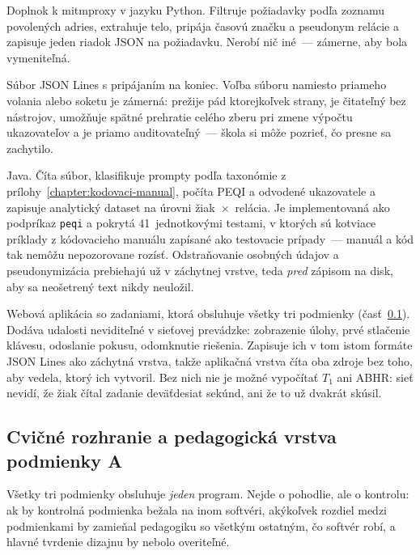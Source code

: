 \begin{description}[leftmargin=2.6cm, style=nextline, nosep]
    \item[Záchytná vrstva] Doplnok k mitmproxy v jazyku Python. Filtruje požiadavky podľa zoznamu povolených adries, extrahuje telo, pripája časovú značku a pseudonym relácie a zapisuje jeden riadok JSON na požiadavku. Nerobí nič iné~--- zámerne, aby bola vymeniteľná.
    \item[Prepojenie] Súbor JSON Lines s pripájaním na koniec. Voľba súboru namiesto priameho volania alebo soketu je zámerná: prežije pád ktorejkoľvek strany, je čitateľný bez nástrojov, umožňuje spätné prehratie celého zberu pri zmene výpočtu ukazovateľov a je priamo auditovateľný~--- škola si môže pozrieť, čo presne sa zachytilo.
    \item[Aplikačná vrstva] Java. Číta súbor, klasifikuje prompty podľa taxonómie z prílohy~\ref{chapter:kodovaci-manual}, počíta PEQI a odvodené ukazovatele a zapisuje analytický dataset na úrovni žiak~$\times$~relácia. Je implementovaná ako podpríkaz \texttt{peqi} a pokrytá 41~jednotkovými testami, v ktorých sú kotviace príklady z kódovacieho manuálu zapísané ako testovacie prípady~--- manuál a kód tak nemôžu nepozorovane rozísť. Odstraňovanie osobných údajov a pseudonymizácia prebiehajú už v záchytnej vrstve, teda \emph{pred} zápisom na disk, aby sa neošetrený text nikdy neuložil.
    \item[Cvičné rozhranie] Webová aplikácia so zadaniami, ktorá obsluhuje všetky tri podmienky (časť~\ref{sec:cvicne-rozhranie}). Dodáva udalosti neviditeľné v sieťovej prevádzke: zobrazenie úlohy, prvé stlačenie klávesu, odoslanie pokusu, odomknutie riešenia. Zapisuje ich v tom istom formáte JSON Lines ako záchytná vrstva, takže aplikačná vrstva číta oba zdroje bez toho, aby vedela, ktorý ich vytvoril. Bez nich nie je možné vypočítať $T_1$ ani ABHR: sieť nevidí, že žiak čítal zadanie deväťdesiat sekúnd, ani že to už dvakrát skúsil.
\end{description}

\subsection{Cvičné rozhranie a pedagogická vrstva podmienky A}
\label{sec:cvicne-rozhranie}

Všetky tri podmienky obsluhuje \emph{jeden} program. Nejde o pohodlie, ale o kontrolu: ak by kontrolná podmienka bežala na inom softvéri, akýkoľvek rozdiel medzi podmienkami by zamieňal pedagogiku so všetkým ostatným, čo softvér robí, a hlavné tvrdenie dizajnu by nebolo overiteľné.

